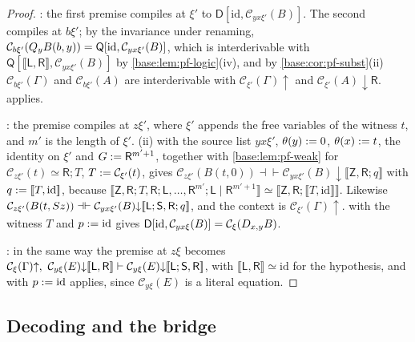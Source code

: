\begin{proof}
: the first premise compiles at $\xi'$ to
$\mathsf D[\mathrm{id},\mathcal C_{yx\xi'}(B)]$.  The second compiles at
$b\xi'$; by the invariance under renaming,
$\mathcal C_{b\xi'}(Q_{y}B(b,y))=\mathsf Q[\mathrm{id},\mathcal C_{yx\xi'}(B)]$,
which is interderivable with
$\mathsf Q[\llbracket\mathsf L,\mathsf R\rrbracket,\mathcal C_{yx\xi'}(B)]$ by
\cref{base:lem:pf-logic}(iv), and by \cref{base:cor:pf-subst}(ii)
$\mathcal C_{b\xi'}(\Gamma)$ and $\mathcal C_{b\xi'}(A)$ are interderivable
with $\mathcal C_{\xi'}(\Gamma){\uparrow}$ and
$\mathcal C_{\xi'}(A){\downarrow}\mathsf R$.   applies.

: the premise compiles at $z\xi'$, where $\xi'$ appends the
free variables of the witness $t$, and $m'$ is the length of $\xi'$.
(ii) with the source list $yx\xi'$,
$\theta(y)\mathrel{:=} 0$, $\theta(x)\mathrel{:=} t$, the identity on $\xi'$ and
$G\mathrel{:=}\mathsf R^{m'+1}$, together with \cref{base:lem:pf-weak} for
$\mathcal C_{z\xi'}(t)\simeq\mathsf R;T$, $T\mathrel{:=}\mathcal C_{\xi'}(t)$,
gives $\mathcal C_{z\xi'}(B(t,0))\dashv\vdash\mathcal C_{yx\xi'}(B){\downarrow}
\llbracket\mathsf Z,\mathsf R;q\rrbracket$ with $q\mathrel{:=}[\![ T,\mathrm{id}]\!]$,
because $\llbracket\mathsf Z,\mathsf R;T,\mathsf R;\mathsf L,\dots,
\mathsf R^{m'};\mathsf L\mid\mathsf R^{m'+1}\rrbracket\simeq
\llbracket\mathsf Z,\mathsf R;\llbracket T,\mathrm{id}\rrbracket\rrbracket$.
Likewise $\mathcal C_{z\xi'}(B(t,S z))\dashv\vdash\mathcal C_{yx\xi'}(B)
{\downarrow}[\![\mathsf L;\mathsf S,\mathsf R;q]\!]$, and the
context is $\mathcal C_{\xi'}(\Gamma){\uparrow}$.   with the
witness $T$ and $p\mathrel{:=}\mathrm{id}$ gives
$\mathsf D[\mathrm{id},\mathcal C_{yx\xi}(B)]=\mathcal C_\xi(D_{x,y}B)$.

: in the same way the premise at $z\xi$ becomes
$\mathcal C_\xi(\Gamma){\uparrow},\ \mathcal C_{y\xi}(E){\downarrow}
\llbracket\mathsf L,\mathsf R\rrbracket\proves\mathcal C_{y\xi}(E){\downarrow}
\llbracket\mathsf L;\mathsf S,\mathsf R\rrbracket$, with
$\llbracket\mathsf L,\mathsf R\rrbracket\simeq\mathrm{id}$ for the
hypothesis, and  with $p\mathrel{:=}\mathrm{id}$ applies, since
$\mathcal C_{y\xi}(E)$ is a literal equation.
\end{proof}

\subsection{Decoding and the bridge}
\label{base:sec:pfbridge}


